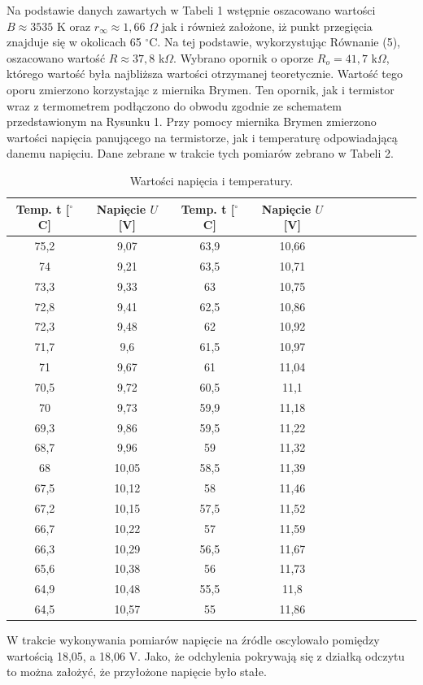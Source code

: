 \documentclass[10pt,a4paper]{article}
\begin{document}
Na podstawie danych zawartych w Tabeli 1 wstępnie oszacowano wartości $B\approx3535$ K oraz $r_{\infty}\approx1,66$ $\Omega$ jak i również założone, iż punkt przegięcia znajduje się w okolicach 65 $^{\circ}$C. Na tej podstawie, wykorzystując Równanie (5), oszacowano wartość $R\approx37,8$ k$\Omega$. Wybrano opornik o oporze $R_{o}=41,7$ k$\Omega$, którego wartość była najbliższa wartości otrzymanej teoretycznie. Wartość tego oporu zmierzono korzystając z miernika Brymen. 
Ten opornik, jak i termistor wraz z termometrem podłączono do obwodu zgodnie ze schematem przedstawionym na Rysunku 1. Przy pomocy miernika Brymen zmierzono wartości napięcia panującego na termistorze, jak i temperaturę odpowiadającą danemu napięciu. Dane zebrane w trakcie tych pomiarów zebrano w Tabeli 2.

\begin{center}
 \begin{table}[h!]
 \centering
 \caption{Wartości napięcia i temperatury.}
 \begin{tabular}{|c|c||c|c|c|c|c|c|c|c|c|}
 \hline
Temp. t [$^{\circ}$C]&Napięcie $U$ [V]&Temp. t [$^{\circ}$C]&Napięcie $U$ [V]\\
\hline
75,2&9,07&63,9&10,66\\
\hline
74&9,21&63,5&10,71\\
\hline
73,3&9,33&63&10,75\\
\hline
72,8&9,41&62,5&10,86\\
\hline
72,3&9,48&62&10,92\\
\hline
71,7&9,6&61,5&10,97\\
\hline
71&9,67&61&11,04\\
\hline
70,5&9,72&60,5&11,1\\
\hline
70&9,73&59,9&11,18\\
\hline
69,3&9,86&59,5&11,22\\
\hline
68,7&9,96&59&11,32\\
\hline
68&10,05&58,5&11,39\\
\hline
67,5&10,12&58&11,46\\
\hline
67,2&10,15&57,5&11,52\\
\hline
66,7&10,22&57&11,59\\
\hline
66,3&10,29&56,5&11,67\\
\hline
65,6&10,38&56&11,73\\
\hline
64,9&10,48&55,5&11,8\\
\hline
64,5&10,57&55&11,86\\
\hline


 \end{tabular}
 \end{table}
 \end{center}
W trakcie wykonywania pomiarów napięcie na źródle oscylowało pomiędzy wartością 18,05, a 18,06 V. Jako, że odchylenia pokrywają się z działką odczytu to można założyć, że przyłożone napięcie było stałe.
\end{document}
